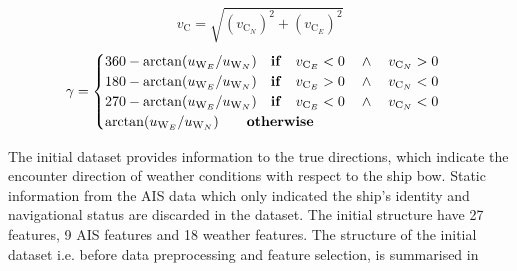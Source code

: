 \begin{equation}\label{eqn:vcurrabs}
    v_{\text{C}} = \sqrt{(v_{\text{C}_N})^2 + (v_{\text{C}_E})^2} 
\end{equation}
\begin{equation}\label{eqn:currdir}
    \gamma = 
    \begin{cases}
        360 - \arctan(u_{\text{W}_{E}} / u_{\text{W}_{N}}) \quad \text{\textbf{if}} \quad v_{\text{C}_E} < 0 \quad \wedge \quad v_{\text{C}_N} > 0 \\ 
        180 - \arctan(u_{\text{W}_{E}} / u_{\text{W}_{N}}) \quad \text{\textbf{if}} \quad v_{\text{C}_E} > 0 \quad \wedge \quad v_{\text{C}_N} < 0 \\ 
        270 - \arctan(u_{\text{W}_{E}} / u_{\text{W}_{N}}) \quad \text{\textbf{if}} \quad v_{\text{C}_E} < 0 \quad \wedge \quad v_{\text{C}_N} < 0 \\
        \arctan(u_{\text{W}_{E}} / u_{\text{W}_{N}}) \qquad \text{\textbf{otherwise}} 
    \end{cases}   
\end{equation}

The initial dataset provides information to the true directions, which indicate the encounter direction of weather conditions with respect to the ship bow. Static information from the AIS data which only indicated the ship's identity and navigational status are discarded in the dataset. The initial structure have 27 features, 9 AIS features and 18 weather features. The structure of the initial dataset i.e. before data preprocessing and feature selection, is summarised in  \\


